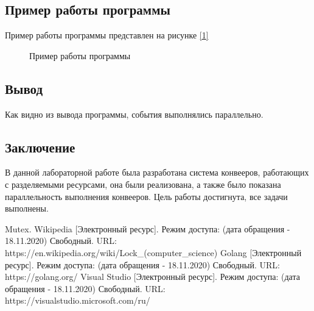 \documentclass{article}
\begin{document}
	\subsection{Пример работы программы}
	Пример работы программы представлен на рисунке \hyperref[programmWork]{[\ref{programmWork}]}
	 	\begin{figure}[h!]
		 	\caption{Пример работы программы}
		 	\label{programmWork}
	 	\end{figure}
	
	
	\subsection{Вывод}
	Как видно из вывода программы, события выполнялись параллельно. 

	\newpage
	\begin{center}
		\section*{Заключение}
	\end{center}
	\indent \indent В данной лабораторной работе была разработана система конвееров, работающих с разделяемыми ресурсами, она были реализована, а также было показана параллельность выполнения конвееров. Цель работы достигнута, все задачи выполнены.
	\newpage
	
	\begin{center}
	\begin{thebibliography}{3}
	Mutex. Wikipedia [Электронный ресурс]. Режим доступа: (дата обращения - 18.11.2020) Свободный. URL: https://en.wikipedia.org/wiki/Lock\_(computer\_science)
	Golang [Электронный ресурс]. Режим доступа: (дата обращения - 18.11.2020) Свободный. URL: https://golang.org/
	Visual Studio [Электронный ресурс]. Режим доступа: (дата обращения - 18.11.2020) Свободный. URL: https://visualstudio.microsoft.com/ru/

	\end{thebibliography}
	\end{center}
\end{document}
